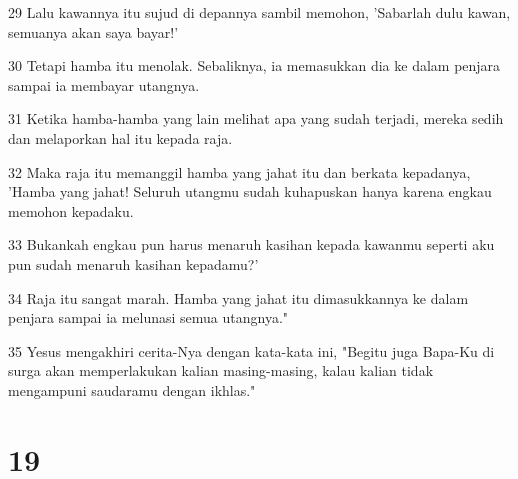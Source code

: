 \par 29 Lalu kawannya itu sujud di depannya sambil memohon, 'Sabarlah dulu kawan, semuanya akan saya bayar!'
\par 30 Tetapi hamba itu menolak. Sebaliknya, ia memasukkan dia ke dalam penjara sampai ia membayar utangnya.
\par 31 Ketika hamba-hamba yang lain melihat apa yang sudah terjadi, mereka sedih dan melaporkan hal itu kepada raja.
\par 32 Maka raja itu memanggil hamba yang jahat itu dan berkata kepadanya, 'Hamba yang jahat! Seluruh utangmu sudah kuhapuskan hanya karena engkau memohon kepadaku.
\par 33 Bukankah engkau pun harus menaruh kasihan kepada kawanmu seperti aku pun sudah menaruh kasihan kepadamu?'
\par 34 Raja itu sangat marah. Hamba yang jahat itu dimasukkannya ke dalam penjara sampai ia melunasi semua utangnya."
\par 35 Yesus mengakhiri cerita-Nya dengan kata-kata ini, "Begitu juga Bapa-Ku di surga akan memperlakukan kalian masing-masing, kalau kalian tidak mengampuni saudaramu dengan ikhlas."

\chapter{19}

